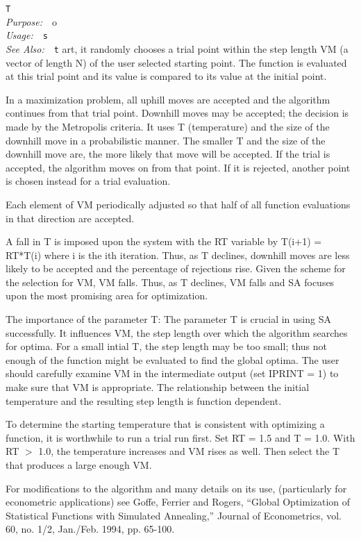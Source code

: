 \documentclass{book}
\makeatletter
\newif\ifpdf
\newenvironment{isisfunction}[4]%
{\index{{#1}@{\tt #1}}%
  \ifpdf
  \else
     \addcontentsline{toc}{subsection}{{#1} -- {#2}}
  \fi
  \vbox{
          \vspace*{\baselineskip}
          {\LARGE\tt #1}\vspace*{\baselineskip}\\
          {{\it Purpose:}~~{#2}}\\
          {{\it Usage:}~~{\tt #3}}\\
          {{\it See Also:}~~{\tt #4}}
       }
}%
{ }
\makeatother
\begin{document}
{\begin{isisfunction}
   To start, it randomly chooses a trial point within the step length
VM (a vector of length N) of the user selected starting point. The
function is evaluated at this trial point and its value is compared
to its value at the initial point.

   In a maximization problem, all uphill moves are accepted and the
algorithm continues from that trial point. Downhill moves may be
accepted; the decision is made by the Metropolis criteria. It uses T
(temperature) and the size of the downhill move in a probabilistic
manner. The smaller T and the size of the downhill move are, the more
likely that move will be accepted. If the trial is accepted, the
algorithm moves on from that point. If it is rejected, another point
is chosen instead for a trial evaluation.

   Each element of VM periodically adjusted so that half of all
function evaluations in that direction are accepted.

   A fall in T is imposed upon the system with the RT variable by
T(i+1) = RT*T(i) where i is the ith iteration. Thus, as T declines,
downhill moves are less likely to be accepted and the percentage of
rejections rise. Given the scheme for the selection for VM, VM falls.
Thus, as T declines, VM falls and SA focuses upon the most promising
area for optimization.

The importance of the parameter T:
   The parameter T is crucial in using SA successfully. It influences
VM, the step length over which the algorithm searches for optima. For
a small intial T, the step length may be too small; thus not enough
of the function might be evaluated to find the global optima. The user
should carefully examine VM in the intermediate output (set IPRINT =
1) to make sure that VM is appropriate. The relationship between the
initial temperature and the resulting step length is function
dependent.

   To determine the starting temperature that is consistent with
optimizing a function, it is worthwhile to run a trial run first. Set
RT = 1.5 and T = 1.0. With RT $>$ 1.0, the temperature increases and VM
rises as well. Then select the T that produces a large enough VM.

For modifications to the algorithm and many details on its
use, (particularly for econometric applications) see Goffe, Ferrier
and Rogers, ``Global Optimization of Statistical Functions
with Simulated Annealing,'' Journal of Econometrics, vol. 60, no.
1/2, Jan./Feb. 1994, pp. 65-100.


\end{isisfunction}}
\end{document}
